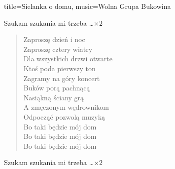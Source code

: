 \begin{song}{title={Sielanka o domu}, music={Wolna Grupa Bukowina}}
\begin{multicols}{2}
    \begin{chorus}
    	Szukam szukania mi trzeba \ldots $\times 2$
    \end{chorus}
    \begin{verse}
        Zaproszę dzień i noc \\
		Zaproszę cztery wiatry \\
		Dla wszystkich drzwi otwarte \\
		Ktoś poda pierwszy ton \\
		Zagramy na góry koncert \\ 
		Buków porą pachnącą \\
		Nasiąkną ściany grą \\
		A zmęczonym wędrownikom \\
		Odpocząć pozwolą muzyką \\
		Bo taki będzie mój dom \\ 
		Bo taki będzie mój dom \\
		Bo taki będzie mój dom
    \end{verse}
    \begin{chorus}
    	Szukam szukania mi trzeba \ldots $\times 2$
    \end{chorus}
\end{multicols}
\end{song}

